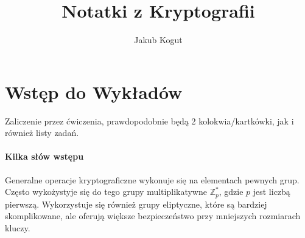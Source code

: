 \documentclass[11pt,a4paper]{article}
\title{Notatki z Kryptografii}
\author{Jakub Kogut}
\begin{document}
\maketitle

\tableofcontents  %
\newpage
\section{Wstęp do Wykładów}
Zaliczenie przez ćwiczenia, prawdopodobnie będą 2 kolokwia/kartkówki, jak i również listy zadań. 
\paragraph{Kilka słów wstępu}
Generalne operacje kryptograficzne wykonuje się na elementach pewnych grup. Często wykożystyje się do tego grupy multiplikatywne $\mathbb{Z}_p^*$, gdzie $p$ jest liczbą pierwszą. Wykorzystuje się również grupy eliptyczne, które są bardziej skomplikowane, ale oferują większe bezpieczeństwo przy mniejszych rozmiarach kluczy.
\end{document}
